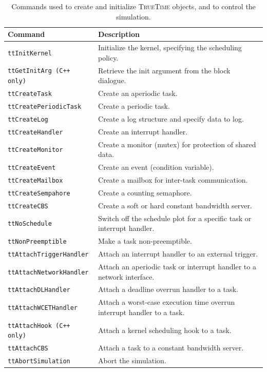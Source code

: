 \documentclass[final,twoside]{rapport}
\begin{document}
\begin{table}
\caption{Commands used to create and initialize \textsc{TrueTime}
  objects, and to control the simulation.}
\label{table:commands}
\small
\begin{center}
\begin{tabularx}{\hsize}{|l|>{\raggedright\arraybackslash}X|}
\hline
Command & Description \\ \hline
{\tt ttInitKernel} & Initialize the kernel, specifying the scheduling policy. \\
{\tt ttGetInitArg (C++ only)} & Retrieve the init argument from the
block dialogue. \\
{\tt ttCreateTask} & Create an aperiodic task.\\
{\tt ttCreatePeriodicTask} & Create a periodic task. \\
{\tt ttCreateLog} & Create a log structure and specify data to log. \\
{\tt ttCreateHandler} & Create an interrupt handler. \\
{\tt ttCreateMonitor} & Create a monitor (mutex) for protection of
shared data. \\
{\tt ttCreateEvent} & Create an event (condition variable). \\
{\tt ttCreateMailbox} & Create a mailbox for inter-task communication. \\
{\tt ttCreateSempahore} & Create a counting semaphore. \\
{\tt ttCreateCBS} & Create a soft or hard constant bandwidth server. \\
{\tt ttNoSchedule} & Switch off the schedule plot for a specific
task or interrupt handler. \\
{\tt ttNonPreemptible} & Make a task non-preemptible. \\
{\tt ttAttachTriggerHandler} & Attach an interrupt handler to an external
trigger.\\
{\tt ttAttachNetworkHandler} & Attach an aperiodic task or interrupt handler 
to a network interface.\\
{\tt ttAttachDLHandler} & Attach a deadline overrun handler to a task.
\\ 
{\tt ttAttachWCETHandler} & Attach a worst-case execution time overrun
interrupt handler to a task. \\
{\tt ttAttachHook (C++ only)} & Attach a kernel scheduling hook to a task. \\ 
{\tt ttAttachCBS} & Attach a task to a constant bandwidth server. \\ 
{\tt ttAbortSimulation} & Abort the simulation. \\ 
\hline
\end{tabularx}
\end{center}
\end{table}
\end{document}
